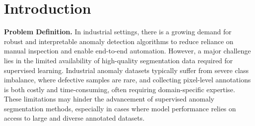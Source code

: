 \documentclass[11pt]{article}
\begin{document}
\section{Introduction}

\textbf{Problem Definition.} In industrial settings, there is a growing demand for robust and interpretable anomaly detection algorithms to reduce reliance on manual inspection and enable end-to-end automation. However, a major challenge lies in the limited availability of high-quality segmentation data required for supervised learning. Industrial anomaly datasets typically suffer from severe class imbalance, where defective samples are rare, and collecting pixel-level annotations is both costly and time-consuming, often requiring domain-specific expertise. These limitations may hinder the advancement of supervised anomaly segmentation methods, especially in cases where model performance relies on access to large and diverse annotated datasets.
\end{document}
